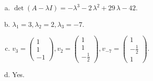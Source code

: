 \begin{questions}
\begin{solution}
\begin{enumerate}[(a)]
\item $\det(A-\lambda I)=-{\lambda}^{3} - 2 \, {\lambda}^{2} + 29 \, {\lambda} - 42$.
\item ${\lambda}_1=3, {\lambda}_2=2, {\lambda}_3=-7$.
\item $v_{3}=\left(\begin{array}{r}
1 \\
1 \\
-1
\end{array}\right), v_{2}=\left(\begin{array}{r}
1 \\
1 \\
-\frac{1}{2}
\end{array}\right), v_{-7}=\left(\begin{array}{r}
1 \\
-\frac{1}{2} \\
1
\end{array}\right)$.
\item Yes.
\end{enumerate}
\end{solution}

\end{questions}

\newpage


\begin{center}
\end{center}

